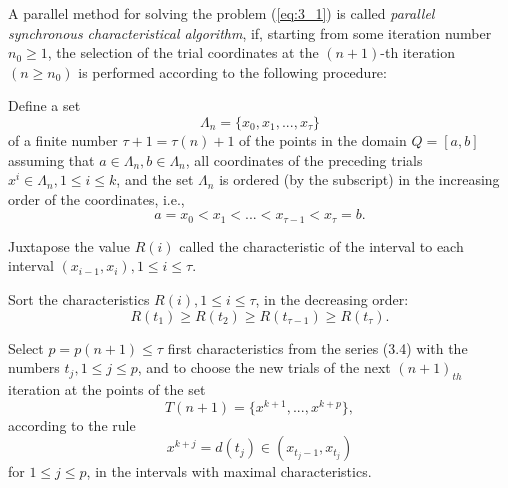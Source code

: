 \begin{definition}
	A parallel method for solving the problem (\ref{eq:3_1}) is called \textit{parallel synchronous characteristical algorithm}, if, starting from some iteration number $n_0\ge1$, the selection of the trial coordinates at the $(n+1)$-th iteration $(n\ge n_0)$ is performed according to the following procedure:
	
	\begin{description} [Step 1.]
	\item [\textbf{Step 1.}] {Define a set 
	\begin{equation}
	\label{eq:3_2}
	\Lambda_n = \{x_0,x_1,...,x_\tau \}
	\end{equation}
	of a finite number $\tau + 1 = \tau(n)+1$ of the points in the domain $Q=[a,b]$ assuming that $a \in \Lambda_n, b \in \Lambda_n$, all coordinates of the preceding trials $x^i \in \Lambda_n, 1 \le i \le k$, and the set $\Lambda_n$ is ordered (by the subscript) in the increasing order of the coordinates, i.e.,
	\begin{equation}
	\label{eq:3_3}
	a = x_0 < x_1 < ... <x_{\tau - 1} < x_\tau = b.
	\end{equation}
	}
	\item [\textbf{Step 2.}] {Juxtapose the value $R(i)$ called the characteristic of the interval to each interval $(x_{i-1}, x_i), 1 \le i \le \tau$.}
	
	\item [\textbf{Step 3.}] {Sort the characteristics $R(i), 1 \le i \le \tau$, in the decreasing order:
	\begin{equation}
	\label{eq:3_4}
	R(t_1) \ge R(t_2) \ge R(t_{\tau - 1}) \ge R(t_\tau).
	\end{equation}
	}
	\item [\textbf{Step 4.}] {Select $p = p(n+1) \le \tau$ first characteristics from the series (3.4) with the numbers $t_j, 1 \le j \le p$, and to choose the new trials of the next $(n+1)_{th}$ iteration at the points of the set 
	\begin{equation}
	\label{eq:3_5}
	T(n+1) = \{x^{k+1}, ...,x^{k+p}\},
	\end{equation}
	according to the rule
	\begin{equation}
	\label{eq:3_6}
	x^{k+j} = d(t_j) \in (x_{t_j - 1}, x_{t_j})
	\end{equation}
	for $1 \le j \le p$, in the intervals with maximal characteristics.}
	\end{description}
\end{definition}

